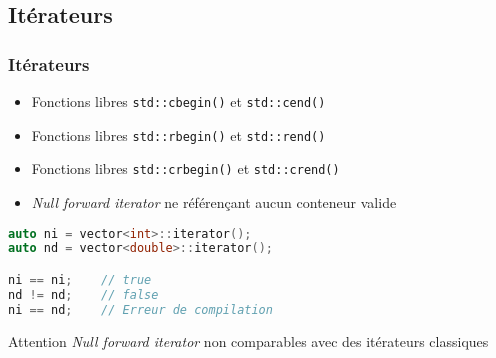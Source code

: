 \documentclass[C++.tex]{subfiles}
\begin{document}
\subsection*{Itérateurs}
\begin{frame}[fragile]
	\frametitle{Itérateurs}
	\begin{itemize}
		\item Fonctions libres \lstinline|std::cbegin()| et \lstinline|std::cend()|
		\item Fonctions libres \lstinline|std::rbegin()| et \lstinline|std::rend()|
		\item Fonctions libres \lstinline|std::crbegin()| et \lstinline|std::crend()|
		\item \textit{Null forward iterator} ne référençant aucun conteneur valide
	\end{itemize}

	\begin{lstlisting}[language=C++]
auto ni = vector<int>::iterator();
auto nd = vector<double>::iterator();

ni == ni;    // true
nd != nd;    // false
ni == nd;    // Erreur de compilation\end{lstlisting}

	\begin{alertblock}{Attention}
		\textit{Null forward iterator} non comparables avec des itérateurs \og classiques\fg{}

	\end{alertblock}
\end{frame}
\end{document}
